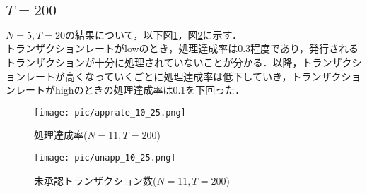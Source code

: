 \documentclass[japanese, macos]{KU2}
\begin{document}
\subsection{$T = 200$}
$N=5,T = 20$の結果について，以下図\ref{fig:apprate_10_20}，図\ref{fig:unapp_10_20}に示す．\\
トランザクションレートがlowのとき，処理達成率は0.3程度であり，発行されるトランザクションが十分に処理されていないことが分かる．以降，トランザクションレートが高くなっていくごとに処理達成率は低下していき，トランザクションレートがhighのときの処理達成率は0.1を下回った．
\begin{figure}[htbp]
  \begin{center}
   \texttt{[image: pic/apprate\_10\_25.png]}
  \end{center}
  \caption{処理達成率($N=11,T=200$)}
  \label{fig:apprate_10_20}
\end{figure}
\begin{figure}
  \begin{center}
   \texttt{[image: pic/unapp\_10\_25.png]}
  \end{center}
  \caption{未承認トランザクション数($N=11,T=200$)}
  \label{fig:unapp_10_20}
\end{figure}
\end{document}
